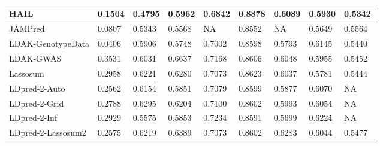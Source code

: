 \documentclass[pdflatex,sn-basic]{sn-jnl}
\begin{document}
\begin{table}[!ht]
{\begin{tabular}{|l|l|l|l|l|l|l|l|l|}
\hline
HAIL \cite{Zhao_2024} & \cellcolor[HTML]{FDC97D}0.1504 & \cellcolor[HTML]{F8696B}0.4795 & \cellcolor[HTML]{E2E383}0.5962 & \cellcolor[HTML]{FCC17C}0.6842 & \cellcolor[HTML]{C3DA81}0.8878 & \cellcolor[HTML]{EEE683}0.6089 & \cellcolor[HTML]{FDD780}0.5930 & \cellcolor[HTML]{FBB178}0.5342 \\
\hline
JAMPred \cite{Newcombe_2019} & \cellcolor[HTML]{FA9F75}0.0807 & \cellcolor[HTML]{FBB078}0.5343 & \cellcolor[HTML]{FCC17C}0.5568 & NA& \cellcolor[HTML]{FEE983}0.8552 & NA& \cellcolor[HTML]{FBA376}0.5649 & \cellcolor[HTML]{E9E583}0.5564 \\
\hline
LDAK-GenotypeData & \cellcolor[HTML]{F98670}0.0406 & \cellcolor[HTML]{DDE182}0.5906 & \cellcolor[HTML]{FEE182}0.5748 & \cellcolor[HTML]{FEDE81}0.7002 & \cellcolor[HTML]{FEEA83}0.8598 & \cellcolor[HTML]{FCBB7A}0.5793 & \cellcolor[HTML]{E9E583}0.6145 & \cellcolor[HTML]{FFEB84}0.5440 \\
\hline
LDAK-GWAS \cite{Zhang_2021} & \cellcolor[HTML]{63BE7B}0.3531 & \cellcolor[HTML]{B6D680}0.6031 & \cellcolor[HTML]{63BE7B}0.6637 & \cellcolor[HTML]{DFE283}0.7168 & \cellcolor[HTML]{FEEB84}0.8606 & \cellcolor[HTML]{F7E984}0.6048 & \cellcolor[HTML]{FEDB81}0.5955 & \cellcolor[HTML]{FDEB84}0.5452 \\
\hline
Lassosum \cite{Mak_2017} & \cellcolor[HTML]{A1D07F}0.2958 & \cellcolor[HTML]{7BC57D}0.6221 & \cellcolor[HTML]{A6D27F}0.6280 & \cellcolor[HTML]{FFEB84}0.7073 & \cellcolor[HTML]{FBEA84}0.8623 & \cellcolor[HTML]{F9EA84}0.6037 & \cellcolor[HTML]{FCBB7A}0.5781 & \cellcolor[HTML]{FFEB84}0.5444 \\
\hline
LDpred-2-Auto \cite{Priv__2020} & \cellcolor[HTML]{CBDC81}0.2562 & \cellcolor[HTML]{8FCB7E}0.6154 & \cellcolor[HTML]{F7E984}0.5851 & \cellcolor[HTML]{FDEB84}0.7079 & \cellcolor[HTML]{FEEA83}0.8599 & \cellcolor[HTML]{FDCD7E}0.5877 & \cellcolor[HTML]{F9EA84}0.6070 & NA\\
\hline
LDpred-2-Grid \cite{Priv__2020} & \cellcolor[HTML]{B3D580}0.2788 & \cellcolor[HTML]{63BE7B}0.6295 & \cellcolor[HTML]{B4D680}0.6204 & \cellcolor[HTML]{F6E984}0.7100 & \cellcolor[HTML]{FFEB84}0.8602 & \cellcolor[HTML]{FEE783}0.5993 & \cellcolor[HTML]{FCEB84}0.6054 & NA\\
\hline
LDpred-2-Inf \cite{Priv__2020} & \cellcolor[HTML]{A4D17F}0.2929 & \cellcolor[HTML]{FDCE7E}0.5575 & \cellcolor[HTML]{F6E984}0.5853 & \cellcolor[HTML]{C8DC81}0.7234 & \cellcolor[HTML]{FEEA83}0.8591 & \cellcolor[HTML]{FBA676}0.5699 & \cellcolor[HTML]{D9E082}0.6224 & NA\\
\hline
LDpred-2-Lassosum2 & \cellcolor[HTML]{C9DC81}0.2575 & \cellcolor[HTML]{7BC57D}0.6219 & \cellcolor[HTML]{92CC7E}0.6389 & \cellcolor[HTML]{FFEB84}0.7073 & \cellcolor[HTML]{FFEB84}0.8602 & \cellcolor[HTML]{C3DA81}0.6283 & \cellcolor[HTML]{FEEB84}0.6044 & \cellcolor[HTML]{F9EA84}0.5477 \\

\end{tabular}}
\end{table}
\end{document}
